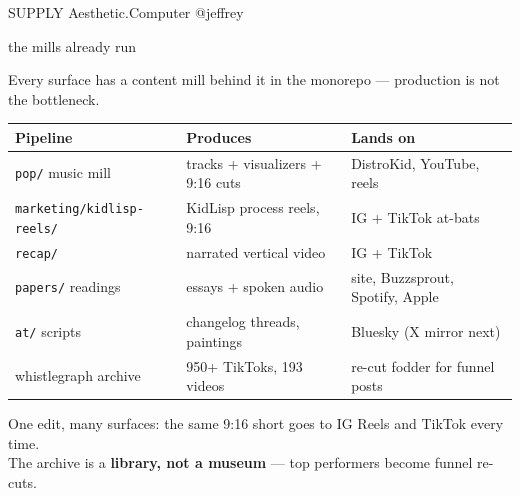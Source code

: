 \documentclass[12pt]{article}
\makeatletter
\newcommand{\rb}{{\color{acred}\textbullet}\hspace{0.6em}}
\newcommand{\ac}{Aesthetic\textcolor{acpink}{.}Computer}
\newenvironment{slide}[2]{%
  \clearpage
  {\footnotesize\color{acgray}\MakeUppercase{#1}\hfill}%
  {\footnotesize\color{acgray}\ac{} \textperiodcentered{} @jeffrey}\par
  \vspace{0.1em}
  {\acbold\fontsize{31pt}{35pt}\selectfont\color{acdark}#2\par}
  \vspace{0.9em}
  \large
}{%
  \vfill
  {\hfill\footnotesize\color{acgray}\thepage}%
}
\makeatother
\begin{document}
\begin{slide}{supply}{the mills already run}
Every surface has a content mill behind it in the monorepo --- production is not the bottleneck.

\vspace{0.8em}
\begin{center}
\normalsize
\begin{tabular}{@{}lll@{}}
\toprule
\textbf{Pipeline} & \textbf{Produces} & \textbf{Lands on} \\
\midrule
\texttt{pop/} music mill & tracks + visualizers + 9:16 cuts & DistroKid, YouTube, reels \\
\texttt{marketing/kidlisp-reels/} & KidLisp process reels, 9:16 & IG + TikTok at-bats \\
\texttt{recap/} & narrated vertical video & IG + TikTok \\
\texttt{papers/} \textrightarrow{} readings & essays + spoken audio & site, Buzzsprout, Spotify, Apple \\
\texttt{at/} scripts & changelog threads, paintings & Bluesky (X mirror next) \\
whistlegraph archive & 950+ TikToks, 193 videos & re-cut fodder for funnel posts \\
\bottomrule
\end{tabular}
\end{center}

\vspace{0.9em}
\rb One edit, many surfaces: the same 9:16 short goes to IG Reels and TikTok every time.\\
\rb The archive is a \textbf{library, not a museum} --- top performers become funnel re-cuts.
\end{slide}
\end{document}
